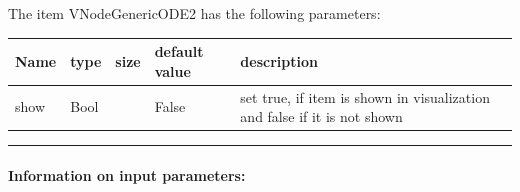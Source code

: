 \noindent The item VNodeGenericODE2 has the following parameters:
\begin{center}
  \footnotesize
  \begin{longtable}{| p{4.5cm} | p{2.5cm} | p{0.5cm} | p{2.5cm} | p{6cm} |}
    \hline
    \bf Name & \bf type & \bf size & \bf default value & \bf description \\ \hline
    show &     Bool &      &     False &     set true, if item is shown in visualization and false if it is not shown\\ \hline
\end{longtable}
\end{center}
\par\noindent\rule{\textwidth}{0.4pt}
\label{description_NodeGenericODE2}
\paragraph{Information on input parameters:} 
\finishTable

